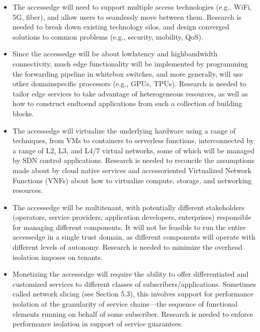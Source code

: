 \documentclass[a4paper,11pt,english]{sphinxmanual}
\begin{document}
\begin{itemize}
\item {} 
\sphinxAtStartPar
{} The access\sphinxhyphen{}edge will need to support multiple
access technologies (e.g., WiFi, 5G, fiber), and allow users to
seamlessly move between them. Research is needed to break down
existing technology silos, and design converged solutions to common
problems (e.g., security, mobility, QoS).

\item {} 
\sphinxAtStartPar
{} Since the access\sphinxhyphen{}edge will be about low\sphinxhyphen{}latency
and high\sphinxhyphen{}bandwidth connectivity, much edge functionality will be
implemented by programming the forwarding pipeline in white\sphinxhyphen{}box
switches, and more generally, will use other domain\sphinxhyphen{}specific
processors (e.g., GPUs, TPUs). Research is needed to tailor edge
services to take advantage of heterogeneous resources, as well as
how to construct end\sphinxhyphen{}to\sphinxhyphen{}end applications from such a collection of
building blocks.

\item {} 
\sphinxAtStartPar
{} The access\sphinxhyphen{}edge will virtualize the underlying
hardware using a range of techniques, from VMs to containers to
serverless functions, interconnected by a range of L2, L3, and L4/7 virtual
networks, some of which will be managed by SDN control
applications. Research is needed to reconcile the assumptions made
about by cloud native services and access\sphinxhyphen{}oriented Virtualized
Network Functions (VNFs) about how to virtualize compute, storage,
and networking resources.

\item {} 
\sphinxAtStartPar
{} The access\sphinxhyphen{}edge will be multi\sphinxhyphen{}tenant, with
potentially different stakeholders (operators, service providers,
application developers, enterprises) responsible for managing
different components. It will not be feasible to run the entire
access\sphinxhyphen{}edge in a single trust domain, as different components will
operate with different levels of autonomy. Research is needed to
minimize the overhead isolation imposes on tenants.

\item {} 
\sphinxAtStartPar
{} Monetizing the access\sphinxhyphen{}edge will require the
ability to offer differentiated and customized services to different
classes of subscribers/applications. Sometimes called network
slicing (see Section 5.3), this involves support for performance isolation at the
granularity of service chains—the sequence of functional elements
running on behalf of some subscriber. Research is needed to enforce
performance isolation in support of service guarantees.


\end{itemize}
\end{document}
